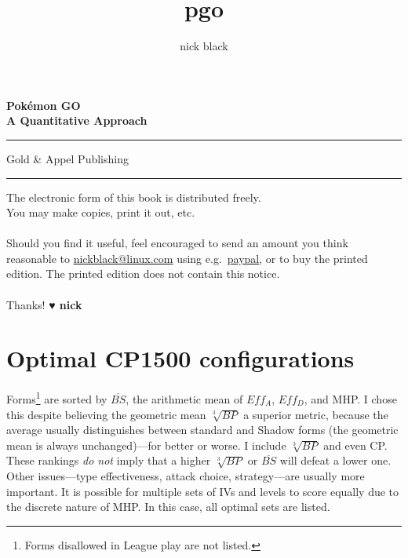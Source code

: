 \documentclass[ebook,10pt,openany,oneside]{memoir}
\title{pgo}
\author{nick black}
\def\LOGO {
  \textbf{
    \Huge Pokémon GO\\
    \Large A Quantitative Approach\\
  }}
\begin{document}
  \pagestyle{empty}
  \begin{center}
  \LOGO
  \vspace{0.5in}
  \end{center}
  \vfill\hrule
  \begin{center}\textsf{Gold \& Appel Publishing}\end{center}
  \hrule
  \clearpage
  \setcounter{page}{1}
  \pagestyle{plain} %

\clearpage
\vfill
\noindent{}The electronic form of this book is distributed freely.\\
You may make copies, print it out, etc.\\
\\
Should you find it useful, feel encouraged to send an amount you think reasonable to
  \href{mailto:nickblack@linux.com}{nickblack@linux.com} using
  e.g.\ \href{https://paypal.me/dankamongmen}{paypal},
  or to buy the printed edition.
The printed edition does not contain this notice.\\
\\
Thanks! {\textbf{{\symbolfont♥} nick}}
\clearpage
\ifdefined\epub
\else
  \hypertarget{toc}{}%
  \tableofcontents*
  \listoftables*
  \fi

%














\appendix
\chapter{Optimal CP1500 configurations}
\label{chap:optimal}
Forms\footnote{Forms disallowed in League play are not listed.} are sorted by $\overline{BS}$,
  the arithmetic mean of $Eff_A$, $Eff_D$, and MHP\@.
I chose this despite believing the geometric mean $\sqrt[3]{BP}$ a superior metric,
  because the average usually distinguishes between standard and Shadow forms
  (the geometric mean is always unchanged)---for better or worse.
I include $\sqrt[3]{BP}$ and even CP.
These rankings \textit{do not} imply that a higher $\sqrt[3]{BP}$ or $\overline{BS}$
  will defeat a lower one.
Other issues---type effectiveness, attack choice, strategy---are usually more important.
It is possible for multiple sets of IVs and levels to score equally due to the discrete nature of MHP\@.
In this case, all optimal sets are listed.
\end{document}
